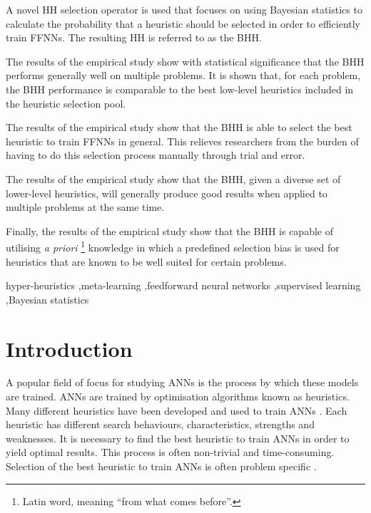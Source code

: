 \documentclass[preprint,review,12pt]{elsarticle}
\begin{document}
\begin{frontmatter}
	\begin{highlights}
		\item A novel \acf{HH} selection operator is used that focuses on using Bayesian statistics to calculate the probability that a heuristic should be selected in order to efficiently train \acfp{FFNN}. The resulting \acs{HH} is referred to as the \acf{BHH}.

		\item The results of the empirical study show with statistical significance that the \acs{BHH} performs generally well on multiple problems. It is shown that, for each problem, the \acs{BHH} performance is comparable to the best low-level heuristics included in the heuristic selection pool.

		\item The results of the empirical study show that the \acs{BHH} is able to select the best heuristic to train \acp{FFNN} in general. This relieves researchers from the burden of having to do this selection process manually through trial and error.

		\item The results of the empirical study show that the \acs{BHH}, given a diverse set of lower-level heuristics, will generally produce good results when applied to multiple problems at the same time.

		\item Finally, the results of the empirical study show that the \acs{BHH} is capable of utilising \textit{a priori} \footnote{Latin word, meaning ``from what comes before''.} knowledge in which a predefined selection bias is used for heuristics that are known to be well suited for certain problems.
	\end{highlights}


	\begin{keyword}
		hyper-heuristics \sep meta-learning \sep feedforward neural networks \sep supervised learning \sep Bayesian statistics
	\end{keyword}
\end{frontmatter}

\linenumbers

\section{Introduction}
\label{sec:introduction}

A popular field of focus for studying \acfp{ANN} is the process by which these models are trained. \acp{ANN} are trained by optimisation algorithms known as heuristics. Many different heuristics have been developed and used to train \acp{ANN} \citep{ref:rakitianskaia:2012}. Each heuristic has different search behaviours, characteristics, strengths and weaknesses. It is necessary to find the best heuristic to train \acp{ANN} in order to yield optimal results. This process is often non-trivial and time-consuming. Selection of the best heuristic to train \acp{ANN} is often problem specific \citep{ref:allen:1996}.
\end{document}
